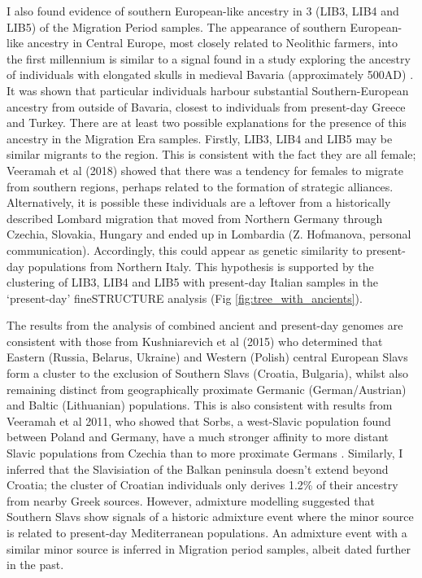 I also found evidence of southern European-like ancestry in 3 (LIB3, LIB4 and LIB5) of the Migration Period samples. The appearance of southern European-like ancestry in Central Europe, most closely related to Neolithic farmers, into the first millennium is similar to a signal found in a study exploring the ancestry of individuals with elongated skulls in medieval Bavaria (approximately 500AD) \cite{Veeramah2018}. It was shown that particular individuals harbour substantial Southern-European ancestry from outside of Bavaria, closest to individuals from present-day Greece and Turkey. There are at least two possible explanations for the presence of this ancestry in the Migration Era samples. Firstly, LIB3, LIB4 and LIB5 may be similar migrants to the region. This is consistent with the fact they are all female; Veeramah et al (2018) showed that there was a tendency for females to migrate from southern regions, perhaps related to the formation of strategic alliances. Alternatively, it is possible these individuals are a leftover from a historically described Lombard migration that moved from Northern Germany through Czechia, Slovakia, Hungary and ended up in Lombardia (Z. Hofmanova, personal communication). Accordingly, this could appear as genetic similarity to present-day populations from Northern Italy. This hypothesis is supported by the clustering of LIB3, LIB4 and LIB5 with present-day Italian samples in the `present-day' fineSTRUCTURE analysis (Fig \ref{fig:tree_with_ancients}).

The results from the analysis of combined ancient and present-day genomes are consistent with those from Kushniarevich et al (2015) \cite{Kushniarevich23015} who determined that Eastern (Russia, Belarus, Ukraine) and Western (Polish) central European Slavs form a cluster to the exclusion of Southern Slavs (Croatia, Bulgaria), whilst also remaining distinct from geographically proximate Germanic (German/Austrian) and Baltic (Lithuanian) populations. This is also consistent with results from Veeramah et al 2011, who showed that Sorbs, a west-Slavic population found between Poland and Germany, have a much stronger affinity to more distant Slavic populations from Czechia than to more proximate Germans \cite{veeramah2011genetic}. Similarly, I inferred that the Slavisiation of the Balkan peninsula doesn't extend beyond Croatia; the cluster of Croatian individuals only derives 1.2\% of their ancestry from nearby Greek sources. However, admixture modelling suggested that Southern Slavs show signals of a historic admixture event where the minor source is related to present-day Mediterranean populations. An admixture event with a similar minor source is inferred in Migration period samples, albeit dated further in the past. 


